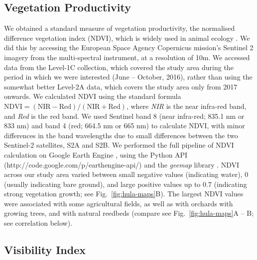 \subsection*{Vegetation Productivity}

We obtained a standard measure of vegetation productivity, the normalised difference vegetation index (NDVI), which is widely used in animal ecology \parencite{pettorelli2011}.
We did this by accessing the European Space Agency Copernicus mission's Sentinel 2 imagery from the multi-spectral instrument, at a resolution of 10m.
We accessed data from the Level-1C collection, which covered the study area during the period in which we were interested (June -- October, 2016), rather than using the somewhat better Level-2A data, which covers the study area only from 2017 onwards.
We calculated NDVI using the standard formula $\text{NDVI} = (\text{NIR} - \text{Red}) / (\text{NIR} + \text{Red})$, where \textit{NIR} is the near infra-red band, and \textit{Red} is the red band.
We used Sentinel band 8 (near infra-red; 835.1 nm or 833 nm) and band 4 (red; 664.5 nm or 665 nm) to
calculate NDVI, with minor differences in the band wavelengths due to small differences between the two Sentinel-2 satellites, S2A and S2B.
We performed the full pipeline of NDVI calculation on Google Earth Engine \parencite{gorelick2017}, using the Python API (http://code.google.com/p/earthengine-api/) and the \textit{geemap} library \parencite{wu2020}.
NDVI across our study area varied between small negative values (indicating water), 0 (usually indicating bare ground), and large positive values up to 0.7 (indicating strong vegetation growth; see Fig.~\ref{fig:hula-maps}B).
The largest NDVI values were associated with some agricultural fields, as well as with orchards with growing trees, and with natural reedbeds (compare see Fig.~\ref{fig:hula-maps}A -- B; see correlation below).

\subsection*{Visibility Index}

